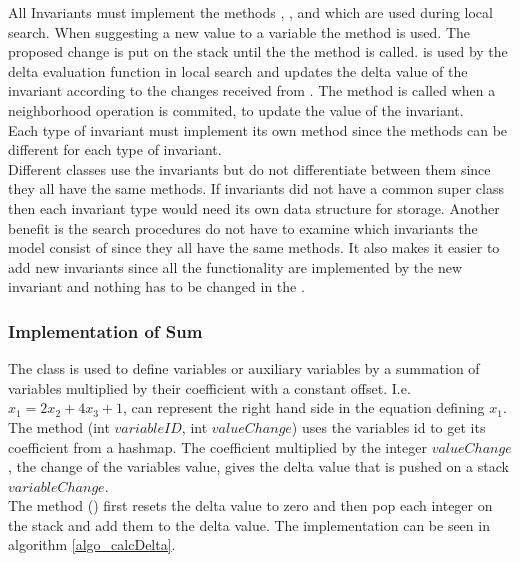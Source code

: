All Invariants must implement the methods , , and 
 which are used during local search. When suggesting a new 
value to a variable the method  is used. The proposed change is put on the stack until the 
the method  is called.  is used by the delta evaluation function in local 
search and updates the delta value of the invariant according to the changes received from . The 
method  is called when a neighborhood operation is commited, to update the value of the invariant. 
\\ Each type of invariant must implement its own method since the methods can be different for each type of invariant. 
\\ 
Different classes use the invariants but do not differentiate between them since they all have the same methods.  
If invariants did not have a common super class then each invariant type would need its own data structure for 
storage. Another benefit is the search procedures do not have to examine which invariants the model consist of since 
they all have the same methods. It also makes it easier to add new invariants since all the functionality are 
implemented by the new invariant and nothing has to be changed in the . \\ 
\subsubsection{Implementation of Sum}
The class  is used to define variables or auxiliary variables by a summation of variables multiplied by 
their coefficient with a constant offset. I.e. $x_1 = 2x_2+4x_3 + 1$,  can represent the right hand side in 
the equation defining $x_1$. \\ 
The method (int  $variableID$, int $valueChange$) uses the variables id to 
get its coefficient from a hashmap. The coefficient multiplied by the integer $valueChange$, the change of the 
variables value, gives the delta value that is pushed on a stack $variableChange$. \\ 
The method () first resets the delta value to zero and then pop each integer on the stack 
and add them to the delta value. The implementation can be seen in algorithm \ref{algo_calcDelta}. 

